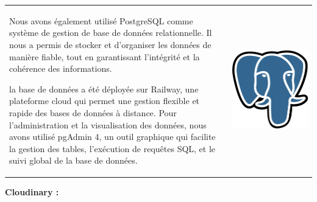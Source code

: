 \documentclass{article}
\begin{document}
\noindent
\begin{tabular}
{@{}m{}@{\hspace{1em}}m{}@{}}
Nous avons également utilisé PostgreSQL comme système de gestion de base de données relationnelle. Il nous a permis de stocker et d’organiser les données de manière fiable, tout en garantissant l’intégrité et la cohérence des informations. 

la base de données a été déployée sur Railway, une plateforme cloud qui permet une gestion flexible et rapide des bases de données à distance.
Pour l’administration et la visualisation des données, nous avons utilisé pgAdmin 4, un outil graphique qui facilite la gestion des tables, l’exécution de requêtes SQL, et le suivi global de la base de données.
&
\includegraphics[width=\linewidth]{postgre.png} %
\end{tabular}

\vspace{0,8cm}

\noindent \large \textbf {Cloudinary \cite{cloudinary}:}
\end{document}
